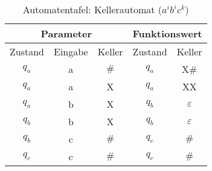 \begin{table}[h]
\centering
\begin{tabular}{|c|c|c||c|c|}
\hline
\multicolumn{3}{|c||}{Parameter} & \multicolumn{2}{c|}{Funktionswert}         \\ \hline
Zustand   	& Eingabe   & Keller  		& Zustand          	& Keller          \\ \hline
$q_a$       & a         & $\#$			& $q_a$             & X\#             \\ \hline
$q_a$       & a         & X       		& $q_a$             & XX              \\ \hline
$q_a$       & b         & X       		& $q_b$     		& $\varepsilon$   \\ \hline
$q_b$       & b         & X       		& $q_b$     		& $\varepsilon$   \\ \hline
$q_b$       & c         & $\#$     		& $q_c$     		& $\#$			  \\ \hline
$q_c$       & c         & $\#$     		& $q_c$     		& $\#$			  \\ \hline
\end{tabular}
\caption{Automatentafel: Kellerautomat ($a^ib^ic^k$)}
\label{tbl:bspkeller}
\end{table}

